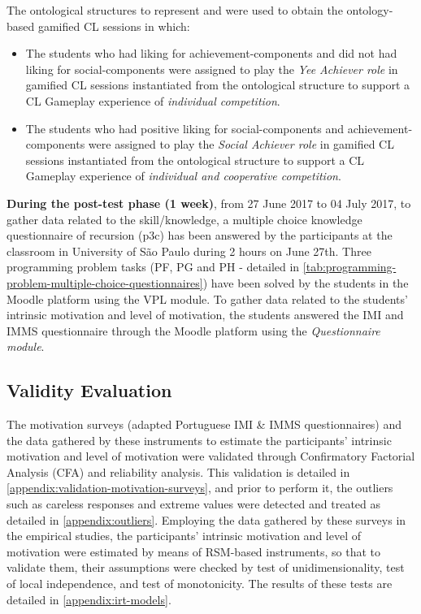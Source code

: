 The ontological structures to represent  and  were used to obtain the ontology-based gamified CL sessions in which:
\begin{itemize}
\item The students who had liking for achievement-components and did not had liking for social-components were assigned to play the \emph{Yee Achiever role} in gamified CL sessions instantiated from the ontological structure  to support a CL Gameplay experience of \emph{individual competition}.
\item The students who had positive liking for social-components and achievement-components were assigned to play the \emph{Social Achiever role} in gamified CL sessions instantiated from the ontological structure  to support a CL Gameplay experience of \emph{individual and cooperative competition}.
\end{itemize}

\textbf{During the post-test phase (1 week)}, from 27 June 2017 to 04 July 2017, to gather data related to the skill/knowledge, a multiple choice knowledge questionnaire of recursion (p3c) has been answered by the participants at the classroom in University of São Paulo during 2 hours on June 27th. Three programming problem tasks (PF, PG and PH - detailed in \autoref{tab:programming-problem-multiple-choice-questionnaires}) have been solved by the students in the Moodle platform using the VPL module. To gather data related to the students' intrinsic motivation and level of motivation, the students answered the IMI and IMMS questionnaire through the Moodle platform using the \emph{Questionnaire module}.

\subsection{Validity Evaluation}
\label{subsec:validity-evaluation}

The motivation surveys (adapted Portuguese IMI \& IMMS questionnaires) and the data gathered by these instruments to estimate the participants' intrinsic motivation and level of motivation were validated through Confirmatory Factorial Analysis (CFA) and reliability analysis. This validation is detailed in \autoref{appendix:validation-motivation-surveys}, and prior to perform it, the outliers such as careless responses and extreme values were detected and treated as detailed in \autoref{appendix:outliers}. Employing the data gathered by these surveys in the empirical studies, the participants' intrinsic motivation and level of motivation were estimated by means of RSM-based instruments, so that to validate them, their assumptions were checked by test of unidimensionality, test of local independence, and test of monotonicity. The results of these tests are detailed in \autoref{appendix:irt-models}.

